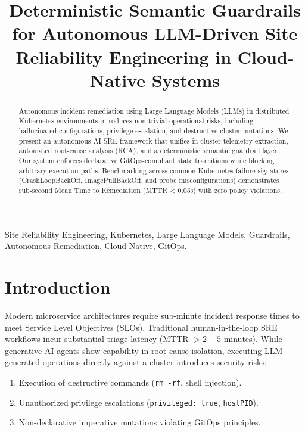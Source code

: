 \documentclass[conference]{IEEEtran}
\begin{document}
\title{Deterministic Semantic Guardrails for Autonomous LLM-Driven Site Reliability Engineering in Cloud-Native Systems}

\author{
}

\maketitle

\begin{abstract}
Autonomous incident remediation using Large Language Models (LLMs) in distributed Kubernetes environments introduces non-trivial operational risks, including hallucinated configurations, privilege escalation, and destructive cluster mutations. We present an autonomous AI-SRE framework that unifies in-cluster telemetry extraction, automated root-cause analysis (RCA), and a deterministic semantic guardrail layer. Our system enforces declarative GitOps-compliant state transitions while blocking arbitrary execution paths. Benchmarking across common Kubernetes failure signatures (CrashLoopBackOff, ImagePullBackOff, and probe misconfigurations) demonstrates sub-second Mean Time to Remediation (MTTR < 0.05s) with zero policy violations.
\end{abstract}

\begin{IEEEkeywords}
Site Reliability Engineering, Kubernetes, Large Language Models, Guardrails, Autonomous Remediation, Cloud-Native, GitOps.
\end{IEEEkeywords}

\section{Introduction}
Modern microservice architectures require sub-minute incident response times to meet Service Level Objectives (SLOs). Traditional human-in-the-loop SRE workflows incur substantial triage latency (MTTR $> 2-5$ minutes). While generative AI agents show capability in root-cause isolation, executing LLM-generated operations directly against a cluster introduces security risks:
\begin{enumerate}
    \item Execution of destructive commands (\texttt{rm -rf}, shell injection).
    \item Unauthorized privilege escalations (\texttt{privileged: true}, \texttt{hostPID}).
    \item Non-declarative imperative mutations violating GitOps principles.
\end{enumerate}
\end{document}
